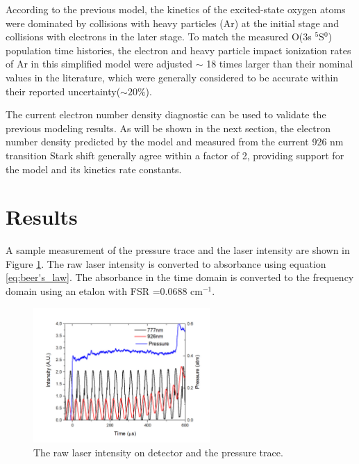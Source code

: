 \documentclass[12pt]{iopart}
\begin{document}
According to the previous model, the kinetics of the excited-state oxygen atoms were dominated by collisions with heavy particles (Ar) at the initial stage and collisions with electrons in the later stage. To match the measured O(3s $^5$S$^0$) population time histories, the electron and heavy particle impact ionization rates of Ar in this simplified model were adjusted $\sim$ 18 times larger than their nominal values in the literature, which were generally considered to be accurate within their reported uncertainty($\sim 20\%$). 

The current electron number density diagnostic can be used to validate the previous modeling results. As will be shown in the next section, the electron number density predicted by the model and measured from the current 926 nm transition Stark shift generally agree within a factor of 2, providing support for the model and its kinetics rate constants.

\section{Results}
A sample measurement of the pressure trace and the laser intensity are shown in Figure \ref{fig:rawI}. The raw laser intensity is converted to absorbance using equation \ref{eq:beer's_law}. The absorbance in the time domain is converted to the frequency domain using an etalon with FSR =0.0688 cm$^{-1}$. 

\begin{figure}[h]
    \centering
    \includegraphics[width=0.6\textwidth]{rawI_24_40mil.jpg}
    \caption{The raw laser intensity on detector and the pressure trace.}
    \label{fig:rawI}
\end{figure}
\end{document}
